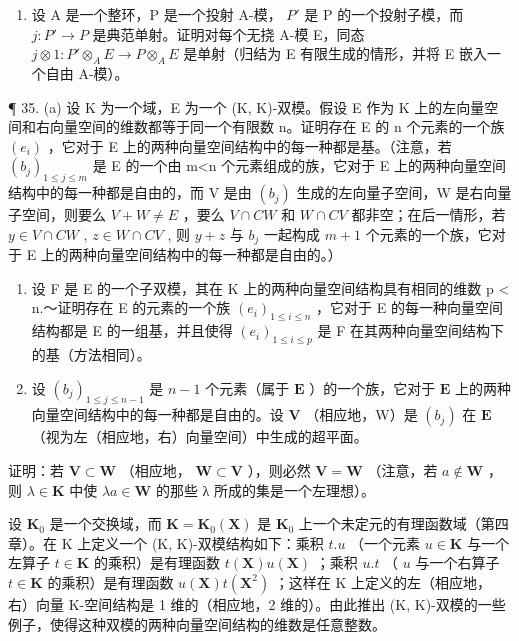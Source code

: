 \begin{enumerate}
\def\labelenumi{\arabic{enumi}.}
\setcounter{enumi}{33}
\tightlist
\item
  设 A 是一个整环，P 是一个投射 A-模， \(P'\) 是 P 的一个投射子模，而 \(j: P' \to P\) 是典范单射。证明对每个无挠 A-模 E，同态 \(j \otimes 1: P' \otimes_{A} E \to P \otimes_{A} E\) 是单射（归结为 E 有限生成的情形，并将 E 嵌入一个自由 A-模）。
\end{enumerate}

¶ 35. (a) 设 K 为一个域，E 为一个 (K, K)-双模。假设 E 作为 K 上的左向量空间和右向量空间的维数都等于同一个有限数 n。证明存在 E 的 n 个元素的一个族 \((e_{i})\) ，它对于 E 上的两种向量空间结构中的每一种都是基。（注意，若 \((b_{j})_{1\leq j\leq m}\) 是 E 的一个由 m\textless n 个元素组成的族，它对于 E 上的两种向量空间结构中的每一种都是自由的，而 V 是由 \((b_{j})\) 生成的左向量子空间，W 是右向量子空间，则要么 \(V+W\neq E\) ，要么 \(V\cap CW\) 和 \(W\cap CV\) 都非空；在后一情形，若 \(y\in V\cap CW\) , \(z\in W\cap CV\) , 则 \(y+z\) 与 \(b_{j}\) 一起构成 \(m+1\) 个元素的一个族，它对于 E 上的两种向量空间结构中的每一种都是自由的。）

\begin{enumerate}
\def\labelenumi{(\alph{enumi})}
\setcounter{enumi}{1}
\item
  设 F 是 E 的一个子双模，其在 K 上的两种向量空间结构具有相同的维数 p \textless{} n.～证明存在 E 的元素的一个族 \((e_{i})_{1 \leqslant i \leqslant n}\) ，它对于 E 的每一种向量空间结构都是 E 的一组基，并且使得 \((e_{i})_{1 \leqslant i \leqslant p}\) 是 F 在其两种向量空间结构下的基（方法相同）。
\item
  设 \((b_{j})_{1\leqslant j\leqslant n - 1}\) 是 \(n - 1\) 个元素（属于 \(\mathbf{E}\) ）的一个族，它对于 \(\mathbf{E}\) 上的两种向量空间结构中的每一种都是自由的。设 \(\mathbf{V}\) （相应地，W）是 \((b_{j})\) 在 \(\mathbf{E}\) （视为左（相应地，右）向量空间）中生成的超平面。
\end{enumerate}

证明：若 \(\mathbf{V} \subset \mathbf{W}\) （相应地， \(\mathbf{W} \subset \mathbf{V}\) ），则必然 \(\mathbf{V} = \mathbf{W}\) （注意，若 \(a \notin \mathbf{W}\) ，则 \(\lambda \in \mathbf{K}\) 中使 \(\lambda a \in \mathbf{W}\) 的那些 λ 所成的集是一个左理想）。

设 \(\mathbf{K}_0\) 是一个交换域，而 \(\mathbf{K} = \mathbf{K}_0(\mathbf{X})\) 是 \(\mathbf{K}_0\) 上一个未定元的有理函数域（第四章）。在 K 上定义一个 (K, K)-双模结构如下：乘积 \(t.u\) （一个元素 \(u \in \mathbf{K}\) 与一个左算子 \(t \in \mathbf{K}\) 的乘积）是有理函数 \(t(\mathbf{X})u(\mathbf{X})\) ；乘积 \(u.t\) （ \(u\) 与一个右算子 \(t \in \mathbf{K}\) 的乘积）是有理函数 \(u(\mathbf{X})t(\mathbf{X}^2)\) ；这样在 K 上定义的左（相应地，右）向量 K-空间结构是 1 维的（相应地，2 维的）。由此推出 (K, K)-双模的一些例子，使得这种双模的两种向量空间结构的维数是任意整数。

